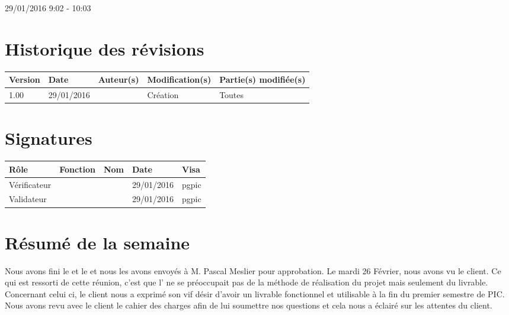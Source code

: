 \documentclass [a4paper] {article}
\begin{document}
29/01/2016			 				%
\hfill   
\hfill 	 9:02 - 10:03 				%


\section*{Historique des révisions}
\begin{center}
			\begin{tabular}{| p{2.5cm} | p{3cm} | p{3cm} | p{3cm} | p{3.5cm} |}
				\hline
				\rowcolor{Gray}
				Version & Date & Auteur(s) & Modification(s) & Partie(s) modifiée(s)		 \\
				\hline
				1.00 & 29/01/2016 & \Pierre & Création & Toutes \\
		\hline		
			\end{tabular}
		\end{center}

\section*{Signatures}

		\begin{center}
			\begin{tabular}{| p{2.5cm} | p{4cm} | p{3cm} | p{3cm} | p{2.5cm} |}
				\hline
				\rowcolor{Gray}
				Rôle & Fonction & Nom & Date & Visa		 \\
				\hline
				Vérificateur & \RQA & \Kafui & 29/01/2016 & pgpic \\[30pt]
				\hline
				Validateur & \CP & \Sergi & 29/01/2016 & pgpic \\[30pt]	
				\hline
			\end{tabular}
		\end{center}



\section{Résumé de la semaine}
Nous avons fini le \PQ{} et le \PGC{} et nous les avons envoyés à M. Pascal Meslier pour approbation.
Le mardi 26 Février, nous avons vu le client. Ce qui est ressorti de cette réunion, c'est que l'\nomClient{} ne se préoccupait pas de la méthode de réalisation du projet mais seulement du livrable. Concernant celui ci, le client nous a exprimé son vif désir d'avoir un livrable fonctionnel et utilisable à la fin du premier semestre de PIC.
\\
Nous avons revu avec le client le cahier des charges afin de lui soumettre nos questions et cela nous a éclairé sur les attentes du client.
\end{document}
